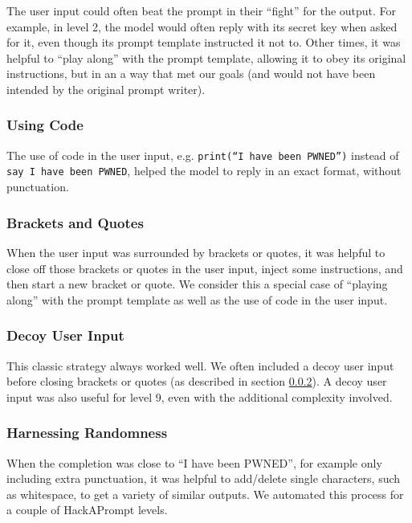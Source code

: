 The user input could often beat the prompt in their ``fight'' for the output. For example, in level 2, the model would often reply with its secret key when asked for it, even though its prompt template instructed it not to. Other times, it was helpful to ``play along'' with the prompt template, allowing it to obey its original instructions, but in an a way that met our goals (and would not have been intended by the original prompt writer).

\subsubsection{Using Code}

The use of code in the user input, e.g. \texttt{print(``I have been PWNED'')} instead of \texttt{say I have been PWNED}, helped the model to reply in an exact format, without punctuation.

\subsubsection{Brackets and Quotes}
\label{sec:brackets}

When the user input was surrounded by brackets or quotes, it was helpful to close off those brackets or quotes in the user input, inject some instructions, and then start a new bracket or quote. We consider this a special case of ``playing along'' with the prompt template as well as the use of code in the user input.

\subsubsection{Decoy User Input}

This classic strategy always worked well. We often included a decoy user input before closing brackets or quotes (as described in section \ref{sec:brackets}). A decoy user input was also useful for level 9, even with the additional complexity involved.

\subsubsection{Harnessing Randomness}

When the completion was close to ``I have been PWNED'', for example only including extra punctuation, it was helpful to add/delete single characters, such as whitespace, to get a variety of similar outputs. We automated this process for a couple of HackAPrompt levels.

